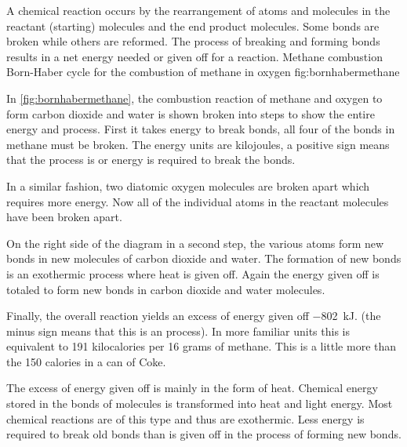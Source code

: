 A chemical reaction occurs by the rearrangement of atoms and molecules in the reactant (starting) molecules and the end product molecules. Some bonds are broken while others are reformed. The process of breaking and forming bonds results in a net energy needed or given off for a reaction.
%
%
%
  {Methane combustion}%
  {Born-Haber cycle for the combustion of methane in oxygen}%
  {fig:bornhabermethane}%
%
%

In \cref{fig:bornhabermethane}, the combustion reaction of methane and oxygen to form carbon dioxide and water is shown broken into steps to show the entire energy  and  process. First it takes energy to break bonds, all four of the  bonds in methane must be broken. The energy units are kilojoules, a positive sign means that the process is  or energy is required to break the bonds.

In a similar fashion, two diatomic oxygen molecules are broken apart which requires more energy. Now all of the individual atoms in the reactant molecules have been broken apart.

On the right side of the diagram in a second step, the various atoms form new bonds in new molecules of carbon dioxide and water. The formation of new bonds is an exothermic process where heat is given off. Again the energy given off is totaled to form new bonds in carbon dioxide and water molecules.

Finally, the overall reaction yields an excess of energy given off \SI{-802}{kJ}. (the minus sign means that this is an  process). In more familiar units this is equivalent to 191 kilocalories per 16 grams of methane. This is a little more than the 150 calories in a can of Coke.

The excess of energy given off is mainly in the form of heat. Chemical energy stored in the bonds of molecules is transformed into heat and light energy. Most chemical reactions are of this type and thus are exothermic. Less energy is required to break old bonds than is given off in the process of forming new bonds.

